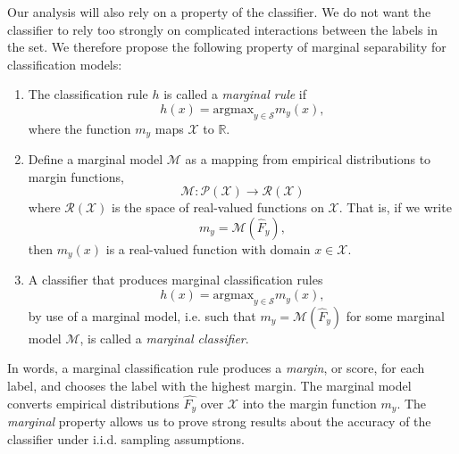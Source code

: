 Our analysis will also rely on a property of the classifier. We do not
want the classifier to rely too strongly on complicated interactions
between the labels in the set. We therefore propose the following
property of marginal separability for classification models:

\begin{definition}
\begin{enumerate}
\item The classification rule $h$ is called a \emph{marginal rule} if 
\[
h(x) = \text{argmax}_{y \in \mathcal{S}} m_y(x),
\]
where the function $m_y$ maps $\mathcal{X}$ to $\mathbb{R}$. 
\item Define a marginal model $\mathcal{M}$ as a mapping from empirical distributions
to margin functions,
\[
\mathcal{M}: \mathcal{P}(\mathcal{X}) \to \mathcal{R}(\mathcal{X})
\]
where $\mathcal{R}(\mathcal{X})$ is the space of real-valued functions on $\mathcal{X}$.
That is, if we write
\[
m_y = \mathcal{M}(\hat{F}_y),
\]
then $m_y(x)$ is a real-valued function with domain $x \in \mathcal{X}$.
\item A classifier that produces marginal classification rules
\[
h(x) = \text{argmax}_{y \in \mathcal{S}} m_y(x),
\]
by use of a marginal model, i.e. such that
$m_y=\mathcal{M}(\hat{F}_y)$ for some marginal model $\mathcal{M}$,
is called a \emph{marginal classifier}.
\end{enumerate}
\end{definition}
In words, a marginal classification rule produces a \emph{margin}, or
score, for each label, and chooses the label with the highest
margin. The marginal model converts empirical distributions
$\hat{F_y}$ over $\mathcal{X}$ into the margin function
$m_y$.  The \emph{marginal} property allows us to prove strong results
about the accuracy of the classifier under i.i.d. sampling assumptions.

